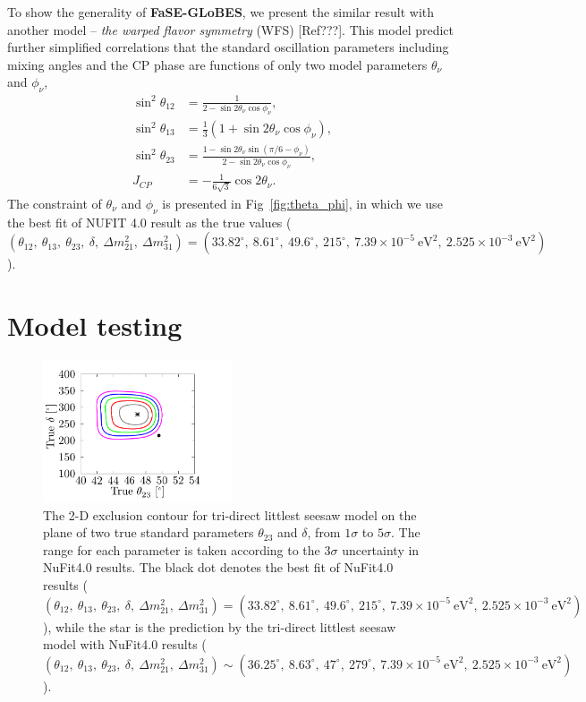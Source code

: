 \documentclass[aps,prd,nofootinbib,preprint]{revtex4}
\begin{document}
{\color{red}To show the generality of \textbf{FaSE-GLoBES}, we present the similar result with another model -- \textit{the warped flavor symmetry} (WFS) [Ref???]. This model predict further simplified correlations that the standard oscillation parameters including mixing angles and the CP phase are functions of only two model parameters $\theta_\nu$ and $\phi_\nu$,
\begin{align}
\sin^2\theta_{12}&=\frac{1}{2-\sin2\theta_{\nu}\cos\phi_\nu},\nonumber\\
\sin^2\theta_{13}&=\frac{1}{3}(1+\sin2\theta_\nu\cos\phi_\nu),\nonumber\\
\sin^2\theta_{23}&=\frac{1-\sin2\theta_\nu\sin(\pi/6-\phi_\nu)}{2-\sin2\theta_\nu\cos\phi_\nu},\nonumber\\
J_{CP}&=-\frac{1}{6\sqrt{3}}\cos2\theta_\nu.
\end{align}
The constraint of $\theta_\nu$ and $\phi_\nu$ is presented in Fig~\ref{fig:theta_phi}, in which we use the best fit of NUFIT 4.0 result as the true values ($(\theta_{12},~\theta_{13},~\theta_{23},~\delta,~\Delta m_{21}^2,~\Delta m_{31}^2)=(33.82^\circ,~8.61^\circ,~49.6^\circ,~215^\circ,~7.39\times10^{-5}~\text{eV}^2,~2.525\times10^{-3}~\text{eV}^2)$).}


\section{Model testing}

\begin{figure}[!h]
 \centering
\includegraphics[width=0.5\textwidth]{Figs/SR_th23_dCP.pdf}
\caption{\label{fig:th23_delta}The 2-D exclusion contour for tri-direct littlest seesaw model on the plane of two true standard parameters $\theta_{23}$ and $\delta$, from $1\sigma$ to $5\sigma$. The range for each parameter is taken according to the $3\sigma$ uncertainty in NuFit4.0 results. The black dot denotes the best fit of NuFit4.0 results ($(\theta_{12},~\theta_{13},~\theta_{23},~\delta,~\Delta m_{21}^2,~\Delta m_{31}^2)=(33.82^\circ,~8.61^\circ,~49.6^\circ,~215^\circ,~7.39\times10^{-5}~\text{eV}^2,~2.525\times10^{-3}~\text{eV}^2)$), while the star is the prediction by the tri-direct littlest seesaw model with NuFit4.0 results ($(\theta_{12},~\theta_{13},~\theta_{23},~\delta,~\Delta m_{21}^2,~\Delta m_{31}^2)\sim(36.25^\circ,~8.63^\circ,~47^\circ,~279^\circ,~7.39\times10^{-5}~\text{eV}^2,~2.525\times10^{-3}~\text{eV}^2)$).}
\end{figure}
\end{document}
